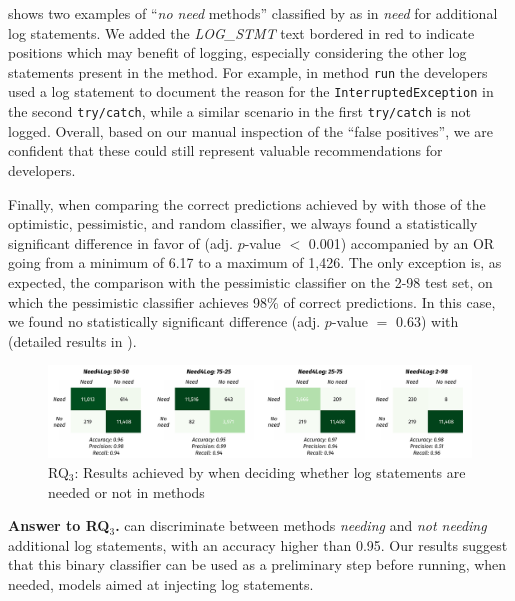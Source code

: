  shows two examples of ``\emph{no need} methods'' classified by \approach as in \emph{need} for additional log statements. We added the \emph{LOG\_STMT} text bordered in red to indicate positions which may benefit of logging, especially considering the other log statements present in the method. For example, in method \texttt{run}  the developers used a log statement to document the reason for the \texttt{InterruptedException} in the second \texttt{try/catch}, while a similar scenario in the first \texttt{try/catch} is not logged. Overall, based on our manual inspection of the ``false positives'', we are confident that these could still represent valuable recommendations for developers.

Finally, when comparing the correct predictions achieved by \approach with those of the optimistic, pessimistic, and random classifier, we always found a statistically significant difference in favor of \approach (adj. $p$-value $<$ 0.001) accompanied by an OR going from a minimum of 6.17 to a maximum of 1,426. The only exception is, as expected, the comparison with the pessimistic classifier on the 2-98 test set, on which the pessimistic classifier achieves 98\% of correct predictions. In this case, we found no statistically significant difference (adj. $p$-value $=$ 0.63) with \approach (detailed results in \cite{replication}).

\begin{figure}[t]
	\centering
	\includegraphics[width=0.95\columnwidth]{img/RQ3-CM.pdf}
	\caption{RQ$_3$: Results achieved by \approach when deciding whether log statements are needed or not in \java methods}
	\label{fig:rq3-cm}
	\vspace{-0.3cm}
\end{figure}

\vspace{0.2cm}
\begin{resultbox}
\textbf{Answer to RQ$_3$.} \approach can discriminate between methods \emph{needing} and \emph{not needing} additional log statements, with an accuracy higher than 0.95. Our results suggest that this binary classifier can be used as a preliminary step before running, when needed, models aimed at injecting log statements.
\end{resultbox}









